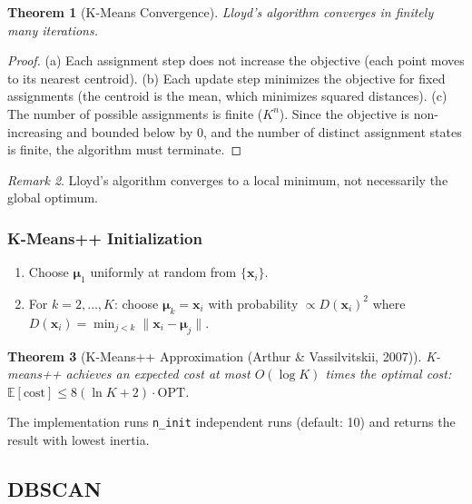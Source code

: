 \documentclass[11pt,a4paper]{article}
\newtheorem{theorem}{Theorem}[section]
\theoremstyle{definition}
\theoremstyle{remark}
\newtheorem{remark}[theorem]{Remark}
\begin{document}
\begin{theorem}[K-Means Convergence]
Lloyd's algorithm converges in finitely many iterations.
\end{theorem}

\begin{proof}
(a) Each assignment step does not increase the objective (each point moves to its nearest centroid). (b) Each update step minimizes the objective for fixed assignments (the centroid is the mean, which minimizes squared distances). (c) The number of possible assignments is finite ($K^n$). Since the objective is non-increasing and bounded below by 0, and the number of distinct assignment states is finite, the algorithm must terminate.
\end{proof}

\begin{remark}
Lloyd's algorithm converges to a local minimum, not necessarily the global optimum.
\end{remark}

\subsubsection*{K-Means++ Initialization}

\begin{enumerate}[label=\arabic*., itemsep=0pt]
\item Choose $\boldsymbol{\mu}_1$ uniformly at random from $\{\mathbf{x}_i\}$.
\item For $k = 2, \ldots, K$: choose $\boldsymbol{\mu}_k = \mathbf{x}_i$ with probability $\propto D(\mathbf{x}_i)^2$ where $D(\mathbf{x}_i) = \min_{j<k}\|\mathbf{x}_i - \boldsymbol{\mu}_j\|$.
\end{enumerate}

\begin{theorem}[K-Means++ Approximation (Arthur \& Vassilvitskii, 2007)]
K-means++ achieves an expected cost at most $O(\log K)$ times the optimal cost: $\mathbb{E}[\text{cost}] \leq 8(\ln K + 2) \cdot \text{OPT}$.
\end{theorem}

The implementation runs \texttt{n\_init} independent runs (default: 10) and returns the result with lowest inertia.

\subsection{DBSCAN}
\label{sec:dbscan}
\end{document}
